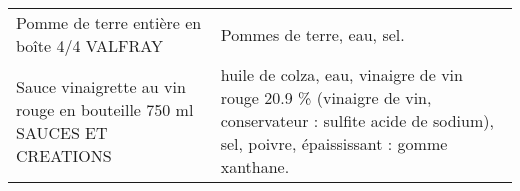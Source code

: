 \begin{longtable}{p{5cm}p{10cm}}
                                                              Pomme de terre entière en boîte 4/4 VALFRAY &                                                                                                                                                                                                                                                                                                                                                                                                                                                                                                                                                                                                                                                                                                                                                                                                                                                                                                                                                                                                               Pommes de terre, eau, sel. \\
                                   Sauce vinaigrette au vin rouge en bouteille 750 ml SAUCES ET CREATIONS &                                                                                                                                                                                                                                                                                                                                                                                                                                                                                                                                                                                                                                                                                                                                                                                                                                                                                 huile de colza, eau, vinaigre de vin rouge 20.9 \% (vinaigre de vin, conservateur : sulfite acide de sodium), sel, poivre, épaississant : gomme xanthane. \\

\end{longtable}
